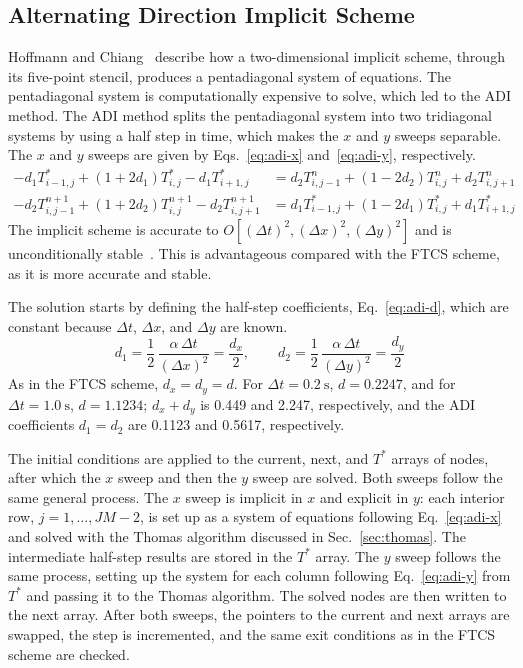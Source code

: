 \documentclass[conf]{new-aiaa}
\begin{document}
\subsection{Alternating Direction Implicit Scheme}
Hoffmann and Chiang~\cite{hoffmann2000} describe how a two-dimensional implicit scheme, through its five-point
stencil, produces a pentadiagonal system of equations. The pentadiagonal system is computationally expensive
to solve, which led to the ADI method. The ADI method splits the pentadiagonal system into two tridiagonal
systems by using a half step in time, which makes the $x$ and $y$ sweeps separable. The $x$ and $y$ sweeps
are given by Eqs.~\eqref{eq:adi-x} and~\eqref{eq:adi-y}, respectively.
\begin{align}
\label{eq:adi-x}
-d_1 T^{*}_{i-1,j} + (1 + 2d_1) T^{*}_{i,j} - d_1 T^{*}_{i+1,j}
 &= d_2 T^{n}_{i,j-1} + (1 - 2d_2) T^{n}_{i,j} + d_2 T^{n}_{i,j+1} \\
\label{eq:adi-y}
-d_2 T^{n+1}_{i,j-1} + (1 + 2d_2) T^{n+1}_{i,j} - d_2 T^{n+1}_{i,j+1}
 &= d_1 T^{*}_{i-1,j} + (1 - 2d_1) T^{*}_{i,j} + d_1 T^{*}_{i+1,j}
\end{align}
The implicit scheme is accurate to $O[(\Delta t)^2, (\Delta x)^2, (\Delta y)^2]$ and is unconditionally
stable~\cite{hoffmann2000}. This is advantageous compared with the FTCS scheme, as it is more accurate and stable.

The solution starts by defining the half-step coefficients, Eq.~\eqref{eq:adi-d}, which are constant because
$\Delta t$, $\Delta x$, and $\Delta y$ are known.
\begin{equation}
  d_1 = \frac{1}{2}\,\frac{\alpha\,\Delta t}{(\Delta x)^2} = \frac{d_x}{2}, \qquad
  d_2 = \frac{1}{2}\,\frac{\alpha\,\Delta t}{(\Delta y)^2} = \frac{d_y}{2}
  \label{eq:adi-d}
\end{equation}
As in the FTCS scheme, $d_x = d_y = d$. For $\Delta t = \SI{0.2}{\second}$, $d = 0.2247$, and for
$\Delta t = \SI{1.0}{\second}$, $d = 1.1234$; $d_x + d_y$ is 0.449 and 2.247, respectively, and the ADI
coefficients $d_1 = d_2$ are 0.1123 and 0.5617, respectively.

The initial conditions are applied to the current, next, and $T^*$ arrays of nodes, after which the $x$ sweep
and then the $y$ sweep are solved. Both sweeps follow the same general process. The $x$ sweep is implicit in
$x$ and explicit in $y$: each interior row, $j = 1, \dots, \mathit{JM}-2$, is set up as a system of equations
following Eq.~\eqref{eq:adi-x} and solved with the Thomas algorithm discussed in Sec.~\ref{sec:thomas}. The
intermediate half-step results are stored in the $T^*$ array. The $y$ sweep follows the same process, setting
up the system for each column following Eq.~\eqref{eq:adi-y} from $T^*$ and passing it to the Thomas
algorithm. The solved nodes are then written to the next array. After both sweeps, the pointers to the
current and next arrays are swapped, the step is incremented, and the same exit conditions as in the FTCS
scheme are checked.
\end{document}
